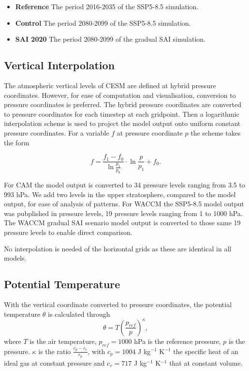 \begin{itemize}
    \item \textbf{Reference} The period 2016-2035 of the SSP5-8.5 simulation.
    \item \textbf{Control} The period 2080-2099 of the SSP5-8.5 simulation.
    \item \textbf{SAI 2020} The period 2080-2099 of the gradual SAI simulation.
\end{itemize} %


\subsection{Vertical Interpolation}
The atmospheric vertical levels of CESM are defined at hybrid pressure coordinates. However, for ease of computation and visualisation, conversion to pressure coordinates is preferred. The hybrid pressure coordinates are converted to pressure coordinates for each timestep at each gridpoint. Then a logarithmic interpolation scheme is used to project the model output onto uniform constant pressure coordinates. For a variable $f$ at pressure coordinate $p$ the scheme takes the form

\begin{equation}
    f = \frac{f_1 - f_0}{\ln\frac{p_1}{p_0}} \cdot \ln \frac{p}{p_1} + f_0.
\end{equation}

For CAM the model output is converted to 34 pressure levels ranging from 3.5 to 993 hPa. We add two levels in the upper stratosphere, compared to the model output, for ease of analysis of patterns. For WACCM the SSP5-8.5 model output was pubplished in pressure levels, 19 pressure levels ranging from 1 to 1000 hPa. The WACCM gradual SAI scenario model output is converted to those same 19 pressure levels to enable direct comparison.

No interpolation is needed of the horizontal grids as these are identical in all models. 


\subsection{Potential Temperature}
With the vertical coordinate converted to pressure coordinates, the potential temperature $\theta$ is calculated through
\begin{equation}
    \theta = T\left( \frac{p_{ref}}{p} \right)^\kappa, 
\end{equation}
where $T$ is the air temperature, $p_{ref} = 1000$ hPa is the reference pressure, $p$ is the pressure. $\kappa$ is the ratio $\frac{c_p - c_v}{c_p}$, with $c_p = 1004$ J kg$^{-1}$ K$^{-1}$ the specific heat of an ideal gas at constant pressure and $c_v = 717$ J kg$^{-1}$ K$^{-1}$ that at constant volume. 
